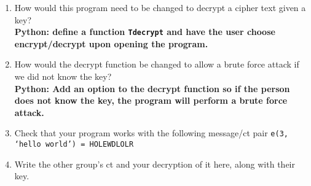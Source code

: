 \documentclass[11pt]{article}
\newcommand{\cmark}{\ding{51}}%
\newenvironment{solution}
  {\textit{Solution.}}
\newcommand{\sol}[1]{
    \begin{customframedproof}
        \begin{solution}
        #1
        \end{solution}
    \end{customframedproof}
}
\begin{document}
\begin{enumerate}
    \item	How would this program need to be changed to decrypt a cipher text given a key? \\
          \textbf{Python: define a function \texttt{Tdecrypt} and have the user choose encrypt/decrypt upon opening the program.}



    \item	How would the decrypt function be changed to allow a brute force attack if we did not know the key? \\
          \textbf{Python: Add an option to the decrypt function so if the person does not know the key, the program will perform a brute force attack.}


    \item	Check that your program works with the following message/ct pair
          \texttt{e(3, `hello world') = HOLEWDLOLR} \cmark

          \setcounter{enumi}{5}

    \item Write the other group's ct and your decryption of it here, along with their key.
\end{enumerate}
\end{document}
